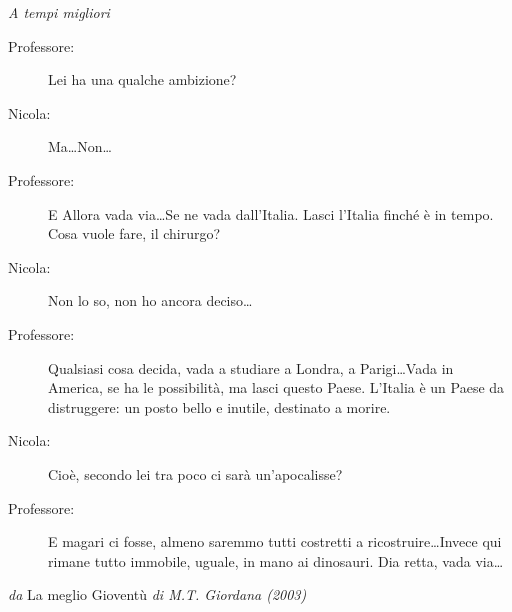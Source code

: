 \thispagestyle{empty}

\null{}
\begin{flushright}
\textit{A tempi migliori}
\null

\begin{minipage}{.8\textwidth}\footnotesize
\begin{description}
\item[Professore:]  Lei ha una qualche ambizione?
\item[Nicola:] Ma\dots Non\dots
\item[Professore:] E Allora vada via\dots Se ne vada dall'Italia. Lasci l'Italia finch\'e \`e in tempo. Cosa vuole fare, il chirurgo?
\item[Nicola:] Non lo so, non ho ancora deciso\dots
\item[Professore:] Qualsiasi cosa decida, vada a studiare a Londra, a Parigi\dots Vada in America, se ha le possibilit\`a, ma lasci questo Paese. L'Italia \`e un Paese da distruggere: un posto bello e inutile, destinato a morire.
\item[Nicola:] Cio\`e, secondo lei tra poco ci sar\`a un'apocalisse?
\item[Professore:] E magari ci fosse, almeno saremmo tutti costretti a ricostruire\dots Invece qui rimane tutto immobile, uguale, in mano ai dinosauri. Dia retta, vada via\dots
\end{description}

\begin{flushright}
\textit{da} La meglio Giovent\`u \textit{di M.T. Giordana (2003)}
\end{flushright}


\end{minipage}
\end{flushright}
